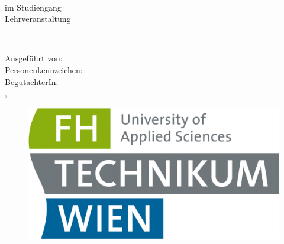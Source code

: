 
\begin{titlepage}

	{\begin{flushleft} \bfseries\huge
			\mytitle\\
	\end{flushleft}}
	{\begin{flushleft} \large
			im Studiengang \mycourse\\
			Lehrveranstaltung \mysubject\\
	\end{flushleft}}

	\vspace{3cm}
	{\begin{flushleft} \bfseries\huge
			\mythema\\
	\end{flushleft}}

	{\begin{flushleft} \large
			Ausgeführt von: \myauthor\\
			Personenkennzeichen: \mykennzeichen\\[10mm]
			BegutachterIn: \myteacher\\[10mm]
			\myort, \mydatum\\
	\end{flushleft}}

	\vfill
	\begin{figure}[!h]
		\begin{flushleft}
			\includegraphics[width=0.35\linewidth]{images/FHTW_logo.png}
		\end{flushleft}
	\end{figure}

\end{titlepage}
